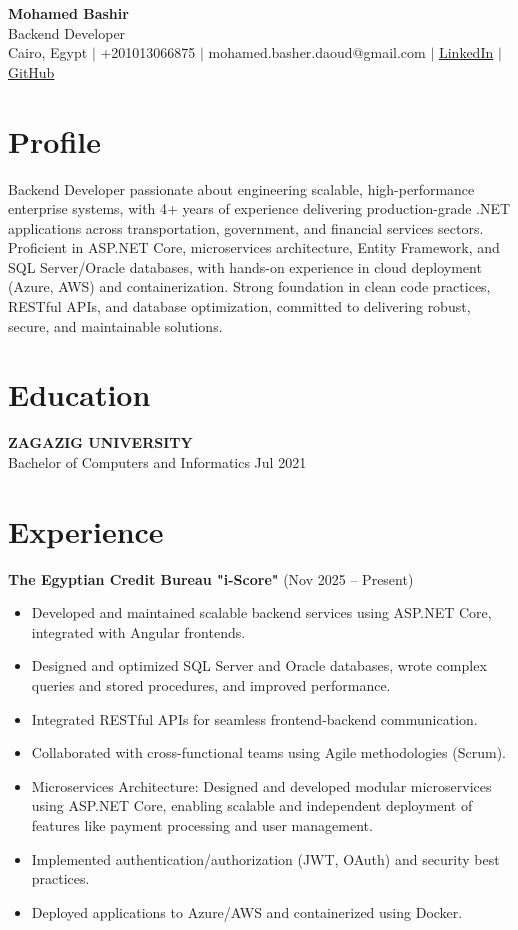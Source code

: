 \documentclass[11pt,a4paper]{article}
\begin{document}
\begin{center}
{\LARGE \textbf{Mohamed Bashir}} \\[2pt]
Backend Developer \\[2pt]
Cairo, Egypt $|$ +201013066875 $|$ mohamed.basher.daoud@gmail.com $|$ \href{https://linkedin.com/in/mohamed-basher}{LinkedIn} $|$ \href{https://github.com/mohamedbashir}{GitHub}
\end{center}

\section*{Profile}
Backend Developer passionate about engineering scalable, high-performance enterprise systems, with 4+ years of experience delivering production-grade .NET applications across transportation, government, and financial services sectors. Proficient in ASP.NET Core, microservices architecture, Entity Framework, and SQL Server/Oracle databases, with hands-on experience in cloud deployment (Azure, AWS) and containerization. Strong foundation in clean code practices, RESTful APIs, and database optimization, committed to delivering robust, secure, and maintainable solutions.

\section*{Education}
\textbf{ZAGAZIG UNIVERSITY} \\
Bachelor of Computers and Informatics \hfill Jul 2021

\section*{Experience}

\textbf{The Egyptian Credit Bureau "i-Score"} (Nov 2025 -- Present)
\begin{itemize}
    \item Developed and maintained scalable backend services using ASP.NET Core, integrated with Angular frontends.
    \item Designed and optimized SQL Server and Oracle databases, wrote complex queries and stored procedures, and improved performance.
    \item Integrated RESTful APIs for seamless frontend-backend communication.
    \item Collaborated with cross-functional teams using Agile methodologies (Scrum).
    \item Microservices Architecture: Designed and developed modular microservices using ASP.NET Core, enabling scalable and independent deployment of features like payment processing and user management.
    \item Implemented authentication/authorization (JWT, OAuth) and security best practices.
    \item Deployed applications to Azure/AWS and containerized using Docker.
\end{itemize}
\end{document}
